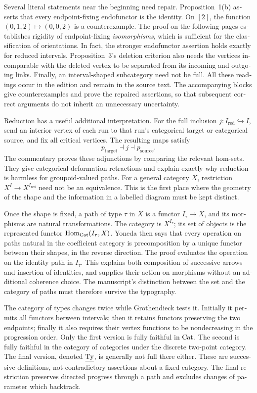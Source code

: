 \begin{otherlanguage}{english}
Several literal statements near the beginning need repair. Proposition~1(b) asserts that every endpoint-fixing endofunctor is the identity. On $[2]$, the function $(0,1,2)\mapsto(0,0,2)$ is a counterexample. The proof on the following pages establishes rigidity of endpoint-fixing \emph{isomorphisms}, which is sufficient for the classification of orientations. In fact, the stronger endofunctor assertion holds exactly for reduced intervals. Proposition~3's deletion criterion also needs the vertices incomparable with the deleted vertex to be separated from its incoming and outgoing links. Finally, an interval-shaped subcategory need not be full. All these readings occur in the edition and remain in the source text. The accompanying blocks give counterexamples and prove the repaired assertions, so that subsequent correct arguments do not inherit an unnecessary uncertainty.

Reduction has a useful additional interpretation. For the full inclusion $j:I_{\mathrm{red}}\hookrightarrow I$, send an interior vertex of each run to that run's categorical target or categorical source, and fix all critical vertices. The resulting maps satisfy
\[
 p_{\mathrm{target}}\dashv j\dashv p_{\mathrm{source}}.
\]
The commentary proves these adjunctions by comparing the relevant hom-sets. They give categorical deformation retractions and explain exactly why reduction is harmless for groupoid-valued paths. For a general category $X$, restriction $X^I\to X^{I_{\mathrm{red}}}$ need not be an equivalence. This is the first place where the geometry of the shape and the information in a labelled diagram must be kept distinct.

Once the shape is fixed, a path of type $\tau$ in $X$ is a functor $I_\tau\to X$, and its morphisms are natural transformations. The category is $X^{I_\tau}$; its set of objects is the represented functor $\mathrm{Hom}_{\mathrm{Cat}}(I_\tau,X)$. Yoneda then says that every operation on paths natural in the coefficient category is precomposition by a unique functor between their shapes, in the reverse direction. The proof evaluates the operation on the identity path in $I_\tau$. This explains both composition of successive arrows and insertion of identities, and supplies their action on morphisms without an additional coherence choice. The manuscript's distinction between the set and the category of paths must therefore survive the typography.

The category of types changes twice while Grothendieck tests it. Initially it permits all functors between intervals; then it retains functors preserving the two endpoints; finally it also requires their vertex functions to be nondecreasing in the progression order. Only the first version is fully faithful in $\mathrm{Cat}$. The second is fully faithful in the category of categories under the discrete two-point category. The final version, denoted $\underline{\mathrm{Ty}}$, is generally not full there either. These are successive definitions, not contradictory assertions about a fixed category. The final restriction preserves directed progress through a path and excludes changes of parameter which backtrack.


\end{otherlanguage}
